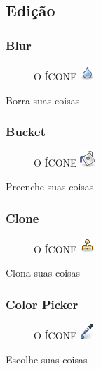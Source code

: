 \documentclass[12pt,onecolumn]{article}
\begin{document}
            
      

  \subsection{Edição}
    \subsubsection{Blur}
      \begin{figure}[H]
        O ÍCONE
        \includegraphics{gimp-icons/stock-tool-blur-22.png}
        \label{fig:blur}
      \end{figure}
      Borra suas coisas

  \subsubsection{Bucket}
      \begin{figure}[H]
        O ÍCONE
        \includegraphics{gimp-icons/stock-tool-bucket-fill-22.png}
        \label{fig:bucket}
      \end{figure}
      Preenche suas coisas
    
    \subsubsection{Clone}
      \begin{figure}[H]
        O ÍCONE
        \includegraphics{gimp-icons/stock-tool-clone-22.png}
        \label{fig:clone}
      \end{figure}
      Clona suas coisas

    \subsubsection{Color Picker}
      \begin{figure}[H]
        O ÍCONE
        \includegraphics{gimp-icons/stock-tool-color-picker-22.png}
        \label{fig:color-picker}
      \end{figure}
      Escolhe suas coisas
      
\end{document}
